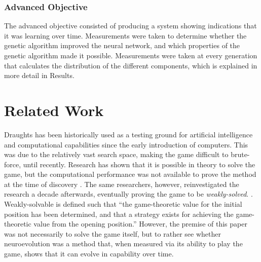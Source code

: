 \documentclass[12pt,a4paper]{article}
\begin{document}
    \subsubsection{Advanced Objective}
        The advanced objective consisted of producing a system showing indications that it was learning over time. Measurements were taken to determine whether the genetic algorithm improved the neural network, and which properties of the genetic algorithm made it possible. Measurements were taken at every generation that calculates the distribution of the different components, which is explained in more detail in Results.
    

\section{Related Work}

        Draughts has been historically used as a testing ground for artificial intelligence and computational capabilities since the early introduction of computers. This was due to the relatively vast search space, making the game difficult to brute-force, until recently. Research has shown that it is possible in theory to solve the game, but the computational performance was not available to prove the method at the time of discovery \cite{schaeffer_solving_1996}. The same researchers, however, reinvestigated the research a decade afterwards, eventually proving the game to be \emph{weakly-solved}. \cite{schaeffer_checkers_2007}. Weakly-solvable is defined such that ``the game-theoretic value for the initial position has been determined, and that a strategy exists for achieving the game-theoretic value from the opening position.'' \cite{allis_searching_1994} However, the premise of this paper was not necessarily to solve the game itself, but to rather see whether neuroevolution was a method that, when measured via its ability to play the game, shows that it can evolve in capability over time.
\end{document}
